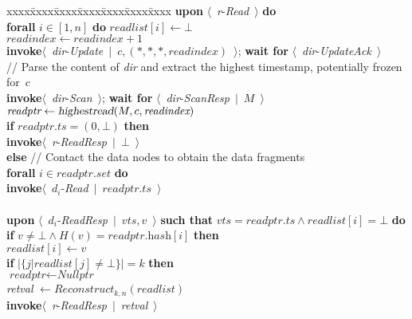 \documentclass[oribibl]{llncs}
\theoremstyle{definition-boldhead}
\newcommand{\var}[1]{\textit{#1}}
\newcommand{\op}[1]{\textsl{#1}}
\newcommand{\newe}{{\bf invoke}\xspace}
\newcommand{\event}[2]{$\langle$~{\var{#1}}-\textsl{#2}~$\rangle$}
\newcommand{\eventt}[3]{$\langle$~{\var{#1}}-\textsl{#2}~$\mid$~{#3}~$\rangle$}
\newcommand{\becomes}{\ensuremath{\leftarrow}}
\newcommand{\dir}{\var{dir}\xspace}
\newcommand{\NAME}{AWE\xspace}
\newcommand{\nodes}{nodes\xspace}
\begin{document}
\begin{alg}\small
\begin{tabbing}
  xxxx\=xxxx\=xxxx\=xxxx\=xxxx\=xxxx\=xxxx\kill
\textbf{upon} \event{r}{Read} \textbf{do} \\
  \> \textbf{forall} $i \in [1,n]$ \textbf{do}
        $\var{readlist}[i] \becomes \bot$ \\
  \> $\var{readindex} \becomes \var{readindex} + 1$ \\
  \> \newe \eventt{dir}{Update}{$c,
        (\ast, \ast, \ast, \var{readindex})$};
     \textbf{wait for} \event{dir}{UpdateAck} \\
  \> // Parse the content of \dir and extract the
      highest timestamp, potentially frozen for~$c$ \\
  \> \newe \event{dir}{Scan};
     \textbf{wait for} \eventt{dir}{ScanResp}{$M$} \\
  \> $\var{readptr} \becomes \op{highestread}(M, c, \var{readindex})$ \\
  \> \textbf{if} $\var{readptr}.\var{ts} = (0,\bot)$ \textbf{then} \\
  \> \> \newe \eventt{r}{ReadResp}{$\bot$} \\
  \> \textbf{else} // Contact the data \nodes to obtain the data fragments\\
  \> \> \textbf{forall} $i \in \var{readptr}.\var{set}$ \textbf{do} \\
  \> \> \> \newe \eventt{$d_i$}{Read}{$\var{readptr}.\var{ts}$} \\
  \\
  \textbf{upon} \eventt{$d_i$}{ReadResp}{$\var{vts}, v$}
	\textbf{such that} $\var{vts} = \var{readptr}.\var{ts} \land
	\var{readlist}[i] = \bot$ \textbf{do} \\
  \> \textbf{if} $v \neq \bot \land H(v) = \var{readptr}.\var{hash}[i]$
        \textbf{then} \\
  \> \> $\var{readlist}[i] \becomes v$ \\
  \> \> \textbf{if} $\bigl|\{j| \var{readlist}[j]\neq \bot\}\bigr| = k$
     \textbf{then} \\
  \> \> \> $\var{readptr} \becomes \var{Nullptr}$ \\
  \> \> \> \var{retval} \becomes $\var{Reconstruct}_{k,n}(\var{readlist})$ \\
  \> \> \> \newe \eventt{r}{ReadResp}{\var{retval}}
\end{tabbing}
\caption{Protocol~\NAME, atomic register instance~\var{r}
  for client~$c$ (part~2).}
\label{alg:client-2}
\end{alg}
\end{document}
